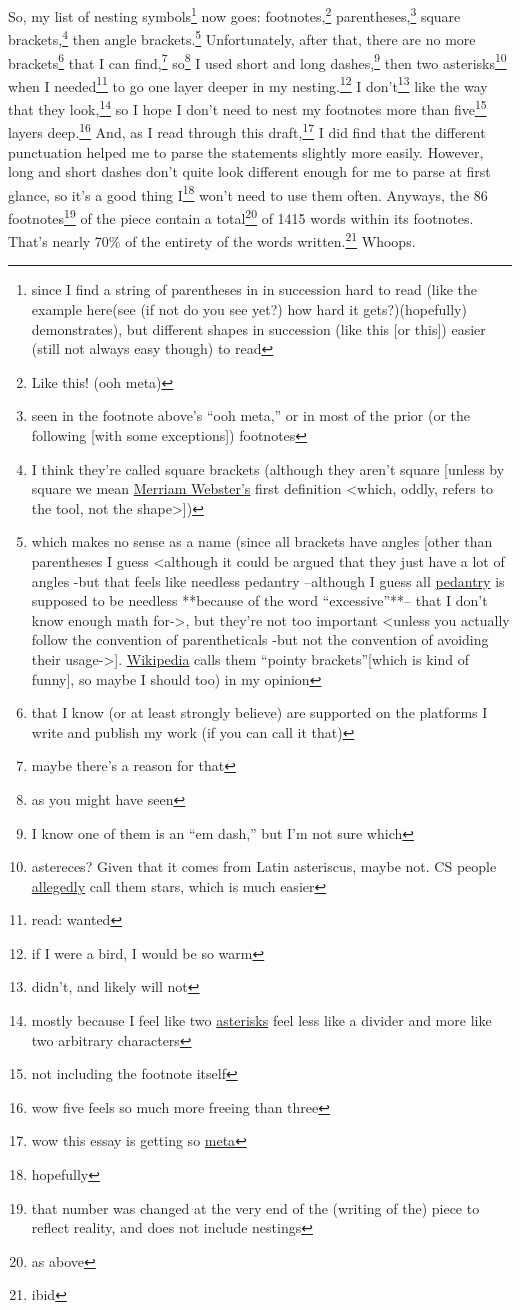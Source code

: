 \documentclass[a4paper]{article}
\newcommand{\say}[1]{``#1''}
\newcommand{\1}{\={a}}
\newcommand{\2}{\={e}}
\newcommand{\3}{\={\i}}
\newcommand{\4}{\=o}
\newcommand{\5}{\=u}
\newcommand{\6}{\={A}}
\newcommand{\<}{\textless}
\renewcommand{\>}{\textgreater}
\renewcommand{\,}{\textsuperscript{,}}
\begin{document}
So, my list of nesting symbols\footnote{since I find a string of parentheses in in succession  hard to read (like the example here(see (if not do you see yet?) how hard it gets?)(hopefully) demonstrates), but different shapes in succession (like this [or this]) easier (still not always easy though) to read} now goes: footnotes,\footnote{Like this! (ooh meta)} parentheses,\footnote{seen in the footnote above's \say{ooh meta,} or in most of the prior (or the following [with some exceptions]) footnotes} square brackets,\footnote{I think they're called square brackets (although they aren't square [unless by square we mean \href{https://www.merriam-webster.com/dictionary/square}{Merriam Webster's} first definition \<which, oddly, refers to the tool, not the shape\>])} then angle brackets.\footnote{which makes no sense as a name (since all brackets have angles [other than parentheses I guess \<although it could be argued that they just have a lot of angles -but that feels like needless pedantry --although I guess all \href{https://en.wiktionary.org/wiki/pedantry}{pedantry} is supposed to be needless **because of the word \say{excessive}**-- that I don't know enough math for-\>, but they're not too important \<unless you actually follow the convention of parentheticals -but not the convention of avoiding their usage-\>]. \href{https://en.wikipedia.org/wiki/Bracket}{Wikipedia} calls them \say{pointy brackets}[which is kind of funny], so maybe I should too) in my opinion}
Unfortunately, after that, there are no more brackets\footnote{that I know (or at least strongly believe) are supported on the platforms I write and publish my work (if you can call it that)} that I can find,\footnote{maybe there's a reason for that} so\footnote{as you might have seen} I used short and long dashes,\footnote{I know one of them is an \say{em dash,} but I'm not sure which} then two asterisks\footnote{astereces? Given that it comes from Latin asteriscus, maybe not. CS people \href{https://en.wikipedia.org/wiki/Asterisk}{allegedly} call them stars, which is much easier} when I needed\footnote{read: wanted} to go one layer deeper in my nesting.\footnote{if I were a bird, I would be so warm}
I don't\footnote{didn't, and likely will not} like the way that they look,\footnote{mostly because I feel like two \href{https://en.wiktionary.org/wiki/asterisk}{asterisks} feel less like a divider and more like two arbitrary characters} so I hope I don't need to nest my footnotes more than five\footnote{not including the footnote itself} layers deep.\footnote{wow five feels so much more freeing than three}
And, as I read through this draft,\footnote{wow this essay is getting so \href{https://xkcd.com/917/}{meta}} I did find that the different punctuation helped me to parse the statements slightly more easily.
However, long and short dashes don't quite look different enough for me to parse at first glance, so it's a good thing I\footnote{hopefully} won't need to use them often.
Anyways, the 86 footnotes\footnote{that number was changed at the very end of the (writing of the) piece to reflect reality, and does not include nestings} of the piece contain a total\footnote{as above} of 1415 words within its footnotes.
That's nearly 70\% of the entirety of the words written.\footnote{ibid}
Whoops.
\end{document}
